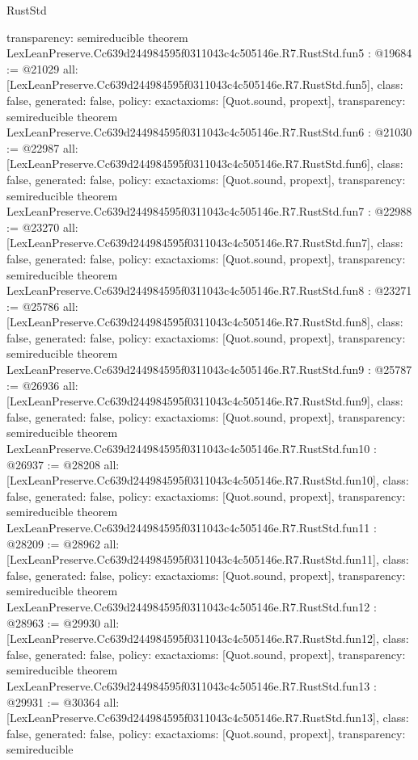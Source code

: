 \begin{lexlean}{RustStd}
\begin{coremodule}
{  transparency: semireducible
}
theorem LexLeanPreserve.Cc639d244984595f0311043c4c505146e.R7.RustStd.fun5 : @19684 := @21029 {
  all: [LexLeanPreserve.Cc639d244984595f0311043c4c505146e.R7.RustStd.fun5],
  class: false,
  generated: false,
  policy: exact{axioms: [Quot.sound, propext]},
  transparency: semireducible
}
theorem LexLeanPreserve.Cc639d244984595f0311043c4c505146e.R7.RustStd.fun6 : @21030 := @22987 {
  all: [LexLeanPreserve.Cc639d244984595f0311043c4c505146e.R7.RustStd.fun6],
  class: false,
  generated: false,
  policy: exact{axioms: [Quot.sound, propext]},
  transparency: semireducible
}
theorem LexLeanPreserve.Cc639d244984595f0311043c4c505146e.R7.RustStd.fun7 : @22988 := @23270 {
  all: [LexLeanPreserve.Cc639d244984595f0311043c4c505146e.R7.RustStd.fun7],
  class: false,
  generated: false,
  policy: exact{axioms: [Quot.sound, propext]},
  transparency: semireducible
}
theorem LexLeanPreserve.Cc639d244984595f0311043c4c505146e.R7.RustStd.fun8 : @23271 := @25786 {
  all: [LexLeanPreserve.Cc639d244984595f0311043c4c505146e.R7.RustStd.fun8],
  class: false,
  generated: false,
  policy: exact{axioms: [Quot.sound, propext]},
  transparency: semireducible
}
theorem LexLeanPreserve.Cc639d244984595f0311043c4c505146e.R7.RustStd.fun9 : @25787 := @26936 {
  all: [LexLeanPreserve.Cc639d244984595f0311043c4c505146e.R7.RustStd.fun9],
  class: false,
  generated: false,
  policy: exact{axioms: [Quot.sound, propext]},
  transparency: semireducible
}
theorem LexLeanPreserve.Cc639d244984595f0311043c4c505146e.R7.RustStd.fun10 : @26937 := @28208 {
  all: [LexLeanPreserve.Cc639d244984595f0311043c4c505146e.R7.RustStd.fun10],
  class: false,
  generated: false,
  policy: exact{axioms: [Quot.sound, propext]},
  transparency: semireducible
}
theorem LexLeanPreserve.Cc639d244984595f0311043c4c505146e.R7.RustStd.fun11 : @28209 := @28962 {
  all: [LexLeanPreserve.Cc639d244984595f0311043c4c505146e.R7.RustStd.fun11],
  class: false,
  generated: false,
  policy: exact{axioms: [Quot.sound, propext]},
  transparency: semireducible
}
theorem LexLeanPreserve.Cc639d244984595f0311043c4c505146e.R7.RustStd.fun12 : @28963 := @29930 {
  all: [LexLeanPreserve.Cc639d244984595f0311043c4c505146e.R7.RustStd.fun12],
  class: false,
  generated: false,
  policy: exact{axioms: [Quot.sound, propext]},
  transparency: semireducible
}
theorem LexLeanPreserve.Cc639d244984595f0311043c4c505146e.R7.RustStd.fun13 : @29931 := @30364 {
  all: [LexLeanPreserve.Cc639d244984595f0311043c4c505146e.R7.RustStd.fun13],
  class: false,
  generated: false,
  policy: exact{axioms: [Quot.sound, propext]},
  transparency: semireducible
}
\end{coremodule}
\end{lexlean}
